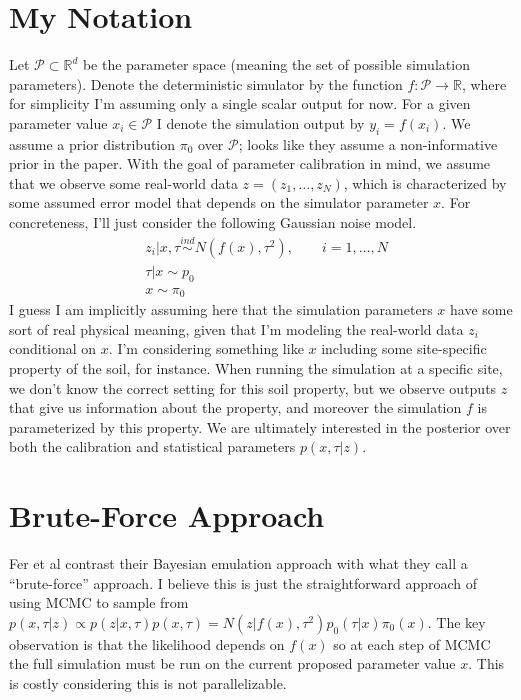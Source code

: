 \documentclass[12pt]{article}
\newcommand{\R}{\mathcal{R}}
\def\R{\mathbb{R}}
\begin{document}
\section{My Notation}
Let $\mathcal{P} \subset \R^d$ be the parameter space (meaning the set of possible simulation parameters). Denote the deterministic simulator by the function $f: \mathcal{P} \to \R$, 
where for simplicity I'm assuming only a single scalar output for now. For a given parameter value $x_i \in \mathcal{P}$ I denote the simulation output by $y_i = f(x_i)$.
 We assume a prior distribution $\pi_0$ over $\mathcal{P}$; looks like they assume a non-informative prior in the paper. 
With the goal of parameter calibration in mind, we assume that we observe some real-world data $z = (z_1, \dots, z_N)$, which is characterized by some assumed error model that depends on the simulator parameter
$x$. For concreteness, I'll just consider the following Gaussian noise model. 
\begin{align*}
&z_i|x, \tau \overset{ind}{\sim} N(f(x), \tau^2), \qquad i = 1, \dots, N \\
&\tau|x \sim p_0 \\
&x \sim \pi_0
\end{align*}
I guess I am implicitly assuming here that the simulation parameters $x$ have some sort of real physical meaning, given that I'm modeling the real-world data $z_i$ conditional on $x$. 
I'm considering something like $x$ including some site-specific property of the soil, for instance. When running the simulation at a specific site, we don't know the correct setting for this soil 
property, but we observe outputs $z$ that give us information about the property, and moreover the simulation $f$ is parameterized by this property. We are ultimately interested in the 
posterior over both the calibration and statistical parameters $p(x, \tau|z)$. 

\section{Brute-Force Approach}
Fer et al contrast their Bayesian emulation approach with what they call a ``brute-force'' approach. I believe this is just the straightforward approach of using MCMC to sample from 
$p(x, \tau|z) \propto p(z|x, \tau)p(x, \tau) = N(z|f(x), \tau^2)p_0(\tau|x)\pi_0(x)$. 
The key observation is that the likelihood depends on $f(x)$ so at each step of MCMC the full simulation must be run on the current proposed parameter value $x$. This is costly considering 
this is not parallelizable. 
\end{document}
